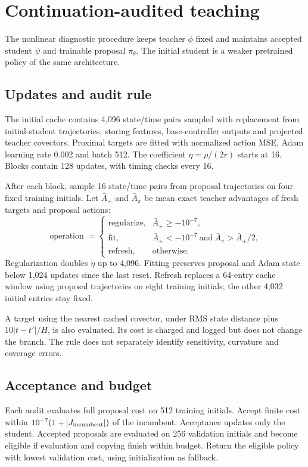 \section{Continuation-audited teaching}
The nonlinear diagnostic procedure keeps teacher $\phi$ fixed and
maintains accepted student $\psi$ and trainable proposal $\pi_\theta$.
The initial student is a weaker pretrained policy of the same architecture.

\subsection{Updates and audit rule}
The initial cache contains 4,096 state/time pairs sampled with replacement
from initial-student trajectories, storing features, base-controller
outputs and projected teacher covectors. Proximal targets are fitted
with normalized action MSE, Adam learning rate 0.002 and batch 512.
The coefficient $\eta=\rho/(2r)$ starts at 16. Blocks contain 128 updates,
with timing checks every 16.

After each block, sample 16 state/time pairs from proposal trajectories
on four fixed training initials. Let $\bar A_+$ and $\bar A_\pi$ be
mean exact teacher advantages of fresh targets and proposal actions:
\begin{equation}\label{eq:operation}
 \operatorname{operation}=\begin{cases}
 \text{regularize},&\bar A_+\geq-10^{-7},\\
 \text{fit},&\bar A_+<-10^{-7}\ \text{and}\ \bar A_\pi>\bar A_+/2,\\
 \text{refresh},&\text{otherwise}.
 \end{cases}
\end{equation}
Regularization doubles $\eta$ up to 4,096. Fitting preserves proposal
and Adam state below 1,024 updates since the last reset. Refresh replaces
a 64-entry cache window using proposal trajectories on eight training
initials; the other 4,032 initial entries stay fixed.

A target using the nearest cached covector, under RMS state distance
plus $10|t-t'|/H$, is also evaluated. Its cost is charged and logged
but does not change the branch. The rule does not separately identify
sensitivity, curvature and coverage errors.

\subsection{Acceptance and budget}
Each audit evaluates full proposal cost on 512 training initials.
Accept finite cost within $10^{-7}(1+|J_{\rm incumbent}|)$ of the
incumbent. Acceptance updates only the student. Accepted proposals are
evaluated on 256 validation initials and become eligible if evaluation
and copying finish within budget. Return the eligible policy with lowest
validation cost, using initialization as fallback.

